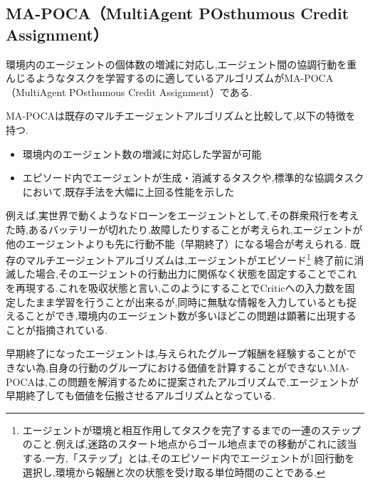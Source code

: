 \subsection{MA-POCA（MultiAgent POsthumous Credit Assignment）}
  環境内のエージェントの個体数の増減に対応し,エージェント間の協調行動を重んじるようなタスクを学習するのに適しているアルゴリズムがMA-POCA（MultiAgent POsthumous Credit Assignment）\cite{mapoca}である.\par 
  MA-POCAは既存のマルチエージェントアルゴリズムと比較して,以下の特徴を持つ.
  \begin{itemize}
    \item 環境内のエージェント数の増減に対応した学習が可能
    \item エピソード内でエージェントが生成・消滅するタスクや,標準的な協調タスクにおいて,既存手法を大幅に上回る性能を示した
  \end{itemize}
  例えば,実世界で動くようなドローンをエージェントとして,その群衆飛行を考えた時,あるバッテリーが切れたり,故障したりすることが考えられ,エージェントが他のエージェントよりも先に行動不能（早期終了）になる場合が考えられる.
  既存のマルチエージェントアルゴリズムは,エージェントがエピソード\footnote{エージェントが環境と相互作用してタスクを完了するまでの一連のステップのこと.例えば,迷路のスタート地点からゴール地点までの移動がこれに該当する.一方,「ステップ」とは,そのエピソード内でエージェントが1回行動を選択し,環境から報酬と次の状態を受け取る単位時間のことである.}
  終了前に消滅した場合,そのエージェントの行動出力に関係なく状態を固定することでこれを再現する.これを吸収状態と言い,このようにすることでCriticへの入力数を固定したまま学習を行うことが出来るが,同時に無駄な情報を入力しているとも捉えることができ,環境内のエージェント数が多いほどこの問題は顕著に出現することが指摘されている.\par
  早期終了になったエージェントは,与えられたグループ報酬を経験することができない為,自身の行動のグループにおける価値を計算することができない.MA-POCAは,この問題を解消するために提案されたアルゴリズムで,エージェントが早期終了しても価値を伝搬させるアルゴリズムとなっている.\par
